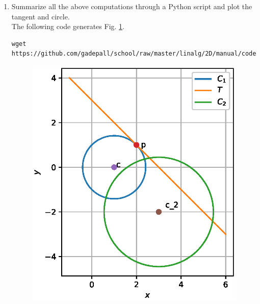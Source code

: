 \documentclass[journal,12pt,twocolumn]{IEEEtran}
\renewcommand\thesection{\arabic{section}}
\begin{document}
\begin{enumerate}[label=\thesection.\arabic*
,ref=\thesection.\theenumi]
\begin{align}
 \vec{A}^T\vec{B}  -\vec{C}^T\brak{\vec{A}+\vec{B}}+\vec{C}^T\vec{C} &=8 - r^2
\\
\implies 8 - \vec{A}^T\vec{B}  +\vec{C}^T\brak{\vec{A}+\vec{B}}-\vec{C}^T\vec{C} &= r^2
\\
\implies 8 - \vec{A}^T\vec{B}  +\vec{C}^T\brak{2\vec{n}+\vec{C}} &= r^2
\\
\implies r =  \sqrt{6}.
\end{align}
\item Summarize all the above computations through a Python script and plot 
the tangent and circle.
\\
\solution The following code generates Fig. \ref{fig:circle}.
\begin{lstlisting}
wget 
https://github.com/gadepall/school/raw/master/linalg/2D/manual/codes/circ.py
\end{lstlisting}
\begin{figure}
\centering
\includegraphics[width=\columnwidth]{./figs/circle.eps}
\caption{}
\label{fig:circle}
\end{figure}

\end{enumerate}
%
\end{document}
